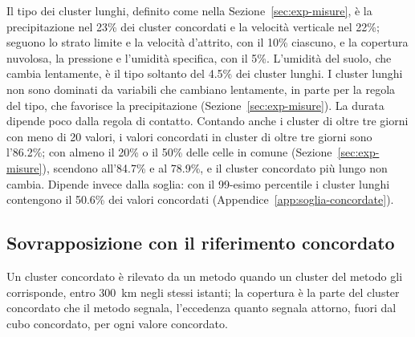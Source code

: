 Il tipo dei cluster lunghi, definito come nella Sezione~\ref{sec:exp-misure}, è la precipitazione nel 23\% dei cluster concordati e la velocità verticale nel 22\%; seguono lo strato limite e la velocità d'attrito, con il 10\% ciascuno, e la copertura nuvolosa, la pressione e l'umidità specifica, con il 5\%. L'umidità del suolo, che cambia lentamente, è il tipo soltanto del 4.5\% dei cluster lunghi. I cluster lunghi non sono dominati da variabili che cambiano lentamente, in parte per la regola del tipo, che favorisce la precipitazione (Sezione~\ref{sec:exp-misure}). La durata dipende poco dalla regola di contatto. Contando anche i cluster di oltre tre giorni con meno di 20 valori, i valori concordati in cluster di oltre tre giorni sono l'86.2\%; con almeno il 20\% o il 50\% delle celle in comune (Sezione~\ref{sec:exp-misure}), scendono all'84.7\% e al 78.9\%, e il cluster concordato più lungo non cambia. Dipende invece dalla soglia: con il 99-esimo percentile i cluster lunghi contengono il 50.6\% dei valori concordati (Appendice~\ref{app:soglia-concordate}).

\subsection{Sovrapposizione con il riferimento concordato}
\label{sec:ris-concordate-sovrapposizione}

Un cluster concordato è rilevato da un metodo quando un cluster del metodo gli corrisponde, entro 300~km negli stessi istanti; la copertura è la parte del cluster concordato che il metodo segnala, l'eccedenza quanto segnala attorno, fuori dal cubo concordato, per ogni valore concordato.

